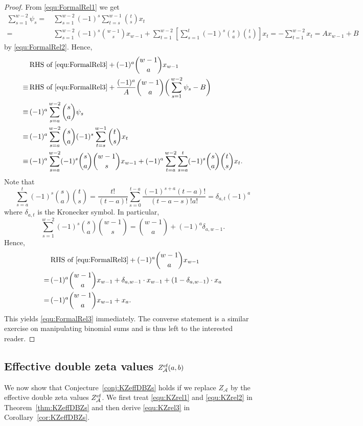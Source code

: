 \documentclass{article}
\newcommand{\calA}{\mathcal{A}}
\newcommand{\eff}{\text{\rm{ef}}}
\theoremstyle{plain}
\theoremstyle{definition}
\begin{document}
\begin{proof}
From \eqref{equ:FormalRel1} we get
\begin{align*}
     \sum_{s=1}^{w-2} \psi_s =&\,  \sum_{s=1}^{w-2} (-1)^s \sum_{t=s}^{w-1}  \binom{t}{s} x_t \\
     =&\, \sum_{s=1}^{w-2}(-1)^s  \binom{w-1}{s} x_{w-1} +  \sum_{t=1}^{w-2}   \left[ \sum_{s=1}^{t}  (-1)^s\binom{s}{a}\binom{t}{s} \right]  x_t
    =  - \sum_{t=1}^{w-2} x_t =A x_{w-1}+B
\end{align*}
by \eqref{equ:FormalRel2}. Hence,
\begin{align*}
&\,\text{RHS of } \eqref{equ:FormalRel3}+  (-1)^a \binom{w-1}{a}   x_{w-1}\\
\equiv &\,
\text{RHS of }  \eqref{equ:FormalRel3}+\frac{(-1)^a}{A} \binom{w-1}{a} \bigg(\sum_{s=1}^{w-2} \psi_s -B\bigg)\\
\equiv &\,(-1)^a \sum_{s=a}^{w-2} \binom{s}{a} \psi_s  \\
\equiv &\,(-1)^a \sum_{s=a}^{w-2}   \binom{s}{a}  (-1)^s \sum_{t=s}^{w-1}  \binom{t}{s} x_t  \\
\equiv &\,(-1)^a \sum_{s=a}^{w-2}  (-1)^s   \binom{s}{a}   \binom{w-1}{s} x_{w-1}
+(-1)^a  \sum_{t=a}^{w-2}  \sum_{s=a}^{t}  (-1)^s \binom{s}{a} \binom{t}{s} x_t.
\end{align*}
Note that
\begin{equation*}
\sum_{s=a}^{t}  (-1)^s\binom{s}{a}\binom{t}{s}
= \frac{t!}{(t-a)!} \sum_{s=0}^{t-a} \frac{(-1)^{s+a} (t-a)!}{(t-a-s)! a!}
= \delta_{a,t} (-1)^a
\end{equation*}
where $\delta_{a,t}$ is the Kronecker symbol. In particular,
\begin{equation*}
\sum_{s=1}^{w-2}  (-1)^s\binom{s}{a}\binom{w-1}{s}
=\binom{w-1}{a}+(-1)^a\delta_{a,w-1}  .
\end{equation*}
Hence,
\begin{align*}
 &\,  \text{RHS of } \eqref{equ:FormalRel3} +(-1)^a \binom{w-1}{a} x_{w-1} \\
= &\,  (-1)^a \binom{w-1}{a} x_{w-1}+ \delta_{a,w-1}  \cdot x_{w-1}+  (1-\delta_{a,w-1}) \cdot x_a  \\
= &\,   (-1)^a \binom{w-1}{a} x_{w-1}+ x_a .
\end{align*}
This yields \eqref{equ:FormalRel3} immediately. The converse statement is a similar exercise on manipulating binomial sums and is thus left to the interested reader.
\end{proof}


\subsection{Effective double zeta values $Z_\calA^\eff(a,b)$}
We now show that Conjecture~\ref{conj:KZeffDBZs} holds if we replace $Z_\calA$ by the effective double zeta values $Z_\calA^\eff$.
We first treat \eqref{equ:KZrel1} and \eqref{equ:KZrel2} in Theorem~\ref{thm:KZeffDBZs} and then derive \eqref{equ:KZrel3}
in Corollary~\ref{cor:KZeffDBZs}.
\end{document}

